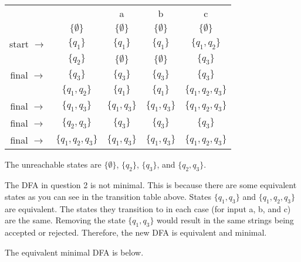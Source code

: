 \documentclass[11pt,fleqn]{article}
\begin{document}
		\begin{table}
		\centering
		\begin{tabular}{cc|c|c|c}
		                         & \diagbox{{}$P(Q)$}{{}$\Sigma$} & a            & b            & c                  \\ 
		\cline{2-5}
		                         & $\{\emptyset\}$                      & $\{\emptyset\}$  & $\{\emptyset\}$  & $\{\emptyset\}$        \\
		start $\rightarrow$      & $\{q_1\}$                            & $\{q_1\}$      & $\{q_1\}$      & $\{q_1, q_2\}$       \\
		                         & $\{q_2\}$                            & $\{\emptyset\}$  & $\{\emptyset\}$  & $\{q_3\}$            \\
		final $\rightarrow$ & $\{q_3\}$                            & $\{q_3\}$      & $\{q_3\}$      & $\{q_3\}$            \\
		                         & $\{q_1, q_2\}$                       & $\{q_1\}$      & $\{q_1\}$      & $\{q_1, q_2, q_3\}$  \\
		final $\rightarrow$ & $\{q_1, q_3\}$                       & $\{q_1, q_3\}$ & $\{q_1, q_3\}$ & $\{q_1, q_2, q_3\}$  \\
		final $\rightarrow$ & $\{q_2, q_3\}$                       & $\{q_3\}$      & $\{q_3\}$      & $\{q_3\}$            \\
		final $\rightarrow$ & $\{q_1, q_2, q_3\}$                  & $\{q_1, q_3\}$ & $\{q_1, q_3\}$ & $\{q_1, q_2, q_3\}$ 
		\end{tabular}
		\end{table}
		
		The unreachable states are $\{\emptyset\}$, $\{q_2\}$, $\{q_3\}$, and $\{q_2, q_3\}$.

        \item The DFA in question 2 is not minimal. This is because there are some equivalent states as you can see in the transition table above. States $\{q_1, q_3\}$ and $\{q_1, q_2, q_3\}$ are equivalent. The states they transition to in each case (for input a, b, and c) are the same. Removing the state $\{q_1, q_3\}$ would result in the same strings being accepted or rejected. Therefore, the new DFA is equivalent and minimal.

        The equivalent minimal DFA is below.
\end{document}

